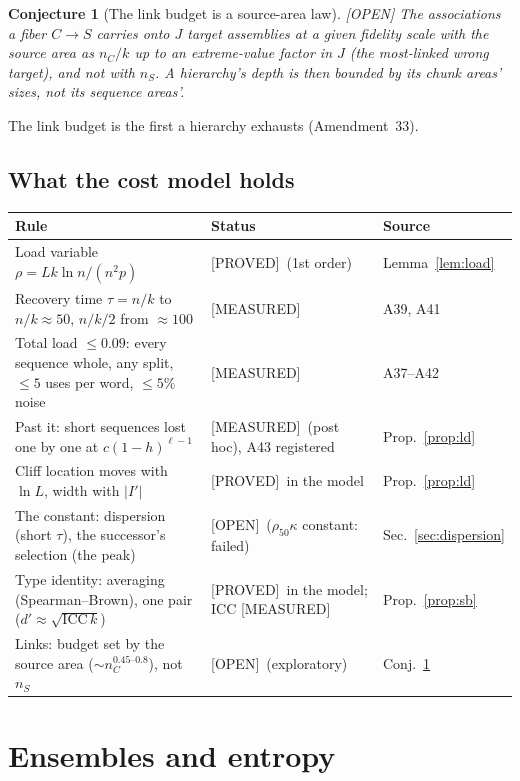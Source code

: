\documentclass[11pt]{article}
\theoremstyle{definition}
\theoremstyle{plain}
\newtheorem{conjecture}[lemma]{Conjecture}
\newcommand{\PROVED}{\textnormal{\footnotesize\textsf{[PROVED]}}}
\newcommand{\MEASURED}{\textnormal{\footnotesize\textsf{[MEASURED]}}}
\newcommand{\OPEN}{\textnormal{\footnotesize\textsf{[OPEN]}}}
\begin{document}
\begin{conjecture}[The link budget is a source-area law]\label{conj:links} \OPEN
The associations a fiber $C \to S$ carries onto $J$ target assemblies at a
given fidelity scale with the source area as $n_C/k$ up to an extreme-value
factor in $J$ (the most-linked wrong target), and not with $n_S$. A hierarchy's
depth is then bounded by its chunk areas' sizes, not its sequence areas'.
\end{conjecture}

\noindent The link budget is the first a hierarchy exhausts (Amendment~33).

\subsection{What the cost model holds}

\begin{center}
\begin{tabular}{p{}p{}p{}}
\toprule
Rule & Status & Source \\
\midrule
Load variable $\rho = Lk\ln n/(n^2p)$ & \PROVED\ (1st order) & Lemma~\ref{lem:load} \\
Recovery time $\tau = n/k$ to $n/k \approx 50$, $n/k/2$ from $\approx 100$ & \MEASURED & A39, A41 \\
Total load $\le 0.09$: every sequence whole, any split, $\le 5$ uses per word, $\le 5\%$ noise & \MEASURED & A37--A42 \\
Past it: short sequences lost one by one at $c(1-h)^{\ell-1}$ & \MEASURED\ (post hoc), A43 registered & Prop.~\ref{prop:ld} \\
Cliff location moves with $\ln L$, width with $|I'|$ & \PROVED\ in the model & Prop.~\ref{prop:ld} \\
The constant: dispersion (short $\tau$), the successor's selection (the peak) & \OPEN\ ($\rho_{50}\kappa$ constant: failed) & Sec.~\ref{sec:dispersion} \\
Type identity: averaging (Spearman--Brown), one pair ($d' \approx \sqrt{\mathrm{ICC}\,k}$) & \PROVED\ in the model; ICC \MEASURED & Prop.~\ref{prop:sb} \\
Links: budget set by the source area ($\sim n_C^{0.45\text{--}0.8}$), not $n_S$ & \OPEN\ (exploratory) & Conj.~\ref{conj:links} \\
\bottomrule
\end{tabular}
\end{center}

\section{Ensembles and entropy}
\end{document}
